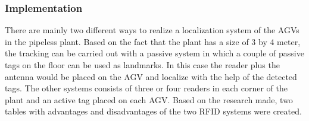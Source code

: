 \subsubsection*{Implementation}
There are mainly two different ways to realize a localization system of the AGVs in the pipeless plant. Based on the fact that the plant has a size of 3 by 4 meter, the tracking can be carried out with a passive system in which a couple of passive tags on the floor can be used as landmarks. In this case the reader plus the antenna would be placed on the AGV and localize with the help of the detected tags. The other systems consists of three or four readers in each corner of the plant and an active tag placed on each AGV.
\newpage Based on the research made, two tables with advantages and disadvantages of the two RFID systems were created.\\ 
